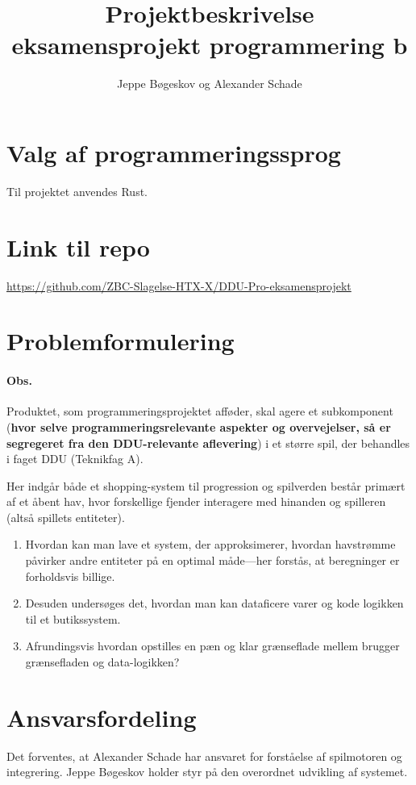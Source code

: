 \documentclass[12pt, a4paper]{article}
\title{
  Projektbeskrivelse\\
  {\large eksamensprojekt programmering b}
}
\author{Jeppe Bøgeskov og Alexander Schade}
\begin{document}
\maketitle
\section*{Valg af programmeringssprog}
Til projektet anvendes Rust.

\section*{Link til repo}
\url{https://github.com/ZBC-Slagelse-HTX-X/DDU-Pro-eksamensprojekt}

\section*{Problemformulering}
\paragraph{Obs.} Produktet, som programmeringsprojektet afføder, skal agere et subkomponent (\textbf{hvor selve programmeringsrelevante aspekter og overvejelser, så er segregeret fra den DDU-relevante aflevering}) i et større spil, der behandles i faget DDU (Teknikfag A).

Her indgår både et shopping-system til progression og spilverden består primært af et åbent hav, hvor forskellige fjender interagere med hinanden og spilleren (altså spillets entiteter).
\begin{displayquote}
  \begin{enumerate}
    \item Hvordan kan man lave et system, der approksimerer, hvordan havstrømme påvirker andre entiteter på en optimal måde---her forstås, at beregninger er forholdsvis billige.
    \item Desuden undersøges det, hvordan man kan dataficere varer og kode logikken til et butikssystem.
    \item Afrundingsvis hvordan opstilles en pæn og klar grænseflade mellem brugger grænsefladen og data-logikken?
\end{enumerate}
\end{displayquote}

\section*{Ansvarsfordeling}
Det forventes, at Alexander Schade har ansvaret for forståelse af spilmotoren og integrering. Jeppe Bøgeskov holder styr på den overordnet udvikling af systemet.
\end{document}
